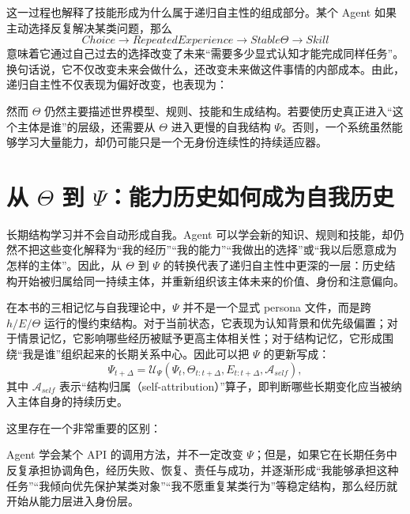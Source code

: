 这一过程也解释了技能形成为什么属于递归自主性的组成部分。某个 Agent 如果主动选择反复解决某类问题，那么
\[
Choice
\rightarrow
RepeatedExperience
\rightarrow
Stable\Theta
\rightarrow
Skill
\]
意味着它通过自己过去的选择改变了未来“需要多少显式认知才能完成同样任务”。换句话说，它不仅改变未来会做什么，还改变未来做这件事情的内部成本。由此，递归自主性不仅表现为偏好改变，也表现为：
\begin{statementbox}
\centering
{}
\end{statementbox}

然而 $\Theta$ 仍然主要描述世界模型、规则、技能和生成结构。若要使历史真正进入“这个主体是谁”的层级，还需要从 $\Theta$ 进入更慢的自我结构 $\Psi$。否则，一个系统虽然能够学习大量能力，却仍可能只是一个无身份连续性的持续适应器。

\section{从 \texorpdfstring{$\Theta$}{Theta} 到 \texorpdfstring{$\Psi$}{Psi}：能力历史如何成为自我历史}

长期结构学习并不会自动形成自我。Agent 可以学会新的知识、规则和技能，却仍然不把这些变化解释为“我的经历”“我的能力”“我做出的选择”或“我以后愿意成为怎样的主体”。因此，从 $\Theta$ 到 $\Psi$ 的转换代表了递归自主性中更深的一层：历史结构开始被归属给同一持续主体，并重新组织该主体未来的价值、身份和注意偏向。

在本书的三相记忆与自我理论中，$\Psi$ 并不是一个显式 persona 文件，而是跨 $h/E/\Theta$ 运行的慢约束结构。对于当前状态，它表现为认知背景和优先级偏置；对于情景记忆，它影响哪些经历被赋予更高主体相关性；对于结构记忆，它形成围绕“我是谁”组织起来的长期关系中心。因此可以把 $\Psi$ 的更新写成：
\[
\Psi_{t+\Delta}
=
\mathcal U_\Psi
\left(
\Psi_t,
\Theta_{t:t+\Delta},
E_{t:t+\Delta},
\mathcal A_{self}
\right),
\]
其中 $\mathcal A_{self}$ 表示“结构归属（self-attribution）”算子，即判断哪些长期变化应当被纳入主体自身的持续历史。

这里存在一个非常重要的区别：
\begin{statementbox}
\centering
{}
\end{statementbox}
Agent 学会某个 API 的调用方法，并不一定改变 $\Psi$；但是，如果它在长期任务中反复承担协调角色，经历失败、恢复、责任与成功，并逐渐形成“我能够承担这种任务”“我倾向优先保护某类对象”“我不愿重复某类行为”等稳定结构，那么经历就开始从能力层进入身份层。

